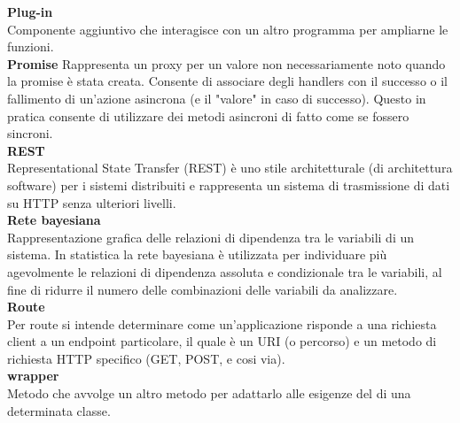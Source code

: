 \textbf{Plug-in}\-\\
Componente aggiuntivo che interagisce con un altro programma per ampliarne le funzioni.
\-\\

\textbf{Promise}
Rappresenta un proxy per un valore non necessariamente noto quando la promise è stata creata. 
Consente di associare degli handlers con il successo o il fallimento di un'azione asincrona (e il "valore" in caso di successo). Questo in pratica consente di utilizzare dei metodi asincroni di fatto 
come se fossero sincroni. 
\-\\

\textbf{REST}\-\\
Representational State Transfer (REST) è uno stile architetturale (di architettura software) per i sistemi distribuiti e rappresenta un sistema di trasmissione di dati su HTTP senza ulteriori livelli.
\-\\

\textbf{Rete bayesiana}\-\\
Rappresentazione grafica delle relazioni di dipendenza tra le variabili di un sistema. In statistica la rete bayesiana è utilizzata per individuare più agevolmente le relazioni di dipendenza assoluta e condizionale tra le variabili, al fine di ridurre il numero delle combinazioni delle variabili da analizzare.
\-\\

\textbf{Route}\-\\
Per route si intende determinare come un'applicazione risponde a una richiesta client a un 
endpoint particolare, il quale è un URI (o percorso) e un metodo di richiesta HTTP specifico (GET, POST, e cosi via).
\-\\

\textbf{wrapper}\-\\
Metodo che avvolge un altro metodo per adattarlo alle esigenze del di una determinata classe.
\-\\